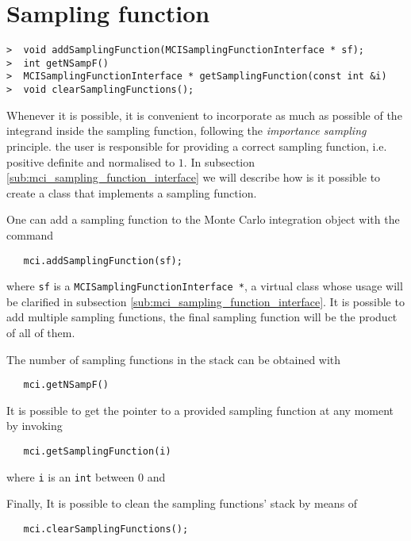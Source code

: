 \documentclass[11pt,a4paper,twoside]{article}
\begin{document}



\section{Sampling function} %
\label{sec:sampling_function}

\begin{verbatim}
>  void addSamplingFunction(MCISamplingFunctionInterface * sf);
>  int getNSampF()
>  MCISamplingFunctionInterface * getSamplingFunction(const int &i)
>  void clearSamplingFunctions();
\end{verbatim}

Whenever it is possible, it is convenient to incorporate as much as possible of the integrand inside the sampling function, following the \emph{importance sampling} principle.
the user is responsible for providing a correct sampling function, i.e. positive definite and normalised to $1$.
In subsection \ref{sub:mci_sampling_function_interface} we will describe how is it possible to create a class that implements a sampling function.

One can add a sampling function to the Monte Carlo integration object with the command
\begin{verbatim}
   mci.addSamplingFunction(sf);
\end{verbatim}
where \verb+sf+ is a \verb+MCISamplingFunctionInterface *+, a virtual class whose usage will be clarified in subsection \ref{sub:mci_sampling_function_interface}.
It is possible to add multiple sampling functions, the final sampling function will be the product of all of them.

The number of sampling functions in the stack can be obtained with
\begin{verbatim}
   mci.getNSampF()
\end{verbatim}

It is possible to get the pointer to a provided sampling function at any moment by invoking
\begin{verbatim}
   mci.getSamplingFunction(i)
\end{verbatim}
where \verb+i+ is an \verb+int+ between $0$ and

Finally, It is possible to clean the sampling functions' stack by means of
\begin{verbatim}
   mci.clearSamplingFunctions();
\end{verbatim}
\end{document}
